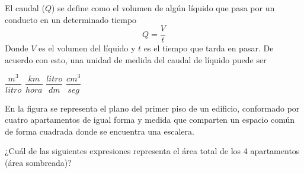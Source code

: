 \documentclass[10pt,addpoints]{exam}
\begin{document}
\begin{questions}
\question El caudal ($Q$) se define como el volumen de algún líquido que pasa por un conducto en un determinado tiempo
\[Q=\dfrac{V}{t}\]
Donde $V$ es el volumen del líquido y $t$ es el tiempo que tarda en pasar.
De acuerdo con esto, una unidad de medida del caudal de líquido puede ser

\begin{oneparchoices}
\choice $\dfrac{m^{3}}{litro}$
\choice $\dfrac{km}{hora}$
\choice $\dfrac{litro}{dm}$
\CorrectChoice $\dfrac{cm^{3}}{seg}$
\end{oneparchoices}
\question En la figura se representa el plano del primer piso de un edificio, conformado por cuatro apartamentos de igual forma y medida que comparten un espacio común de forma cuadrada donde se encuentra una escalera.
\begin{center}
\end{center}
¿Cuál de las siguientes expresiones representa el área total de los 4 apartamentos (área sombreada)?


\end{questions}
\end{document}
